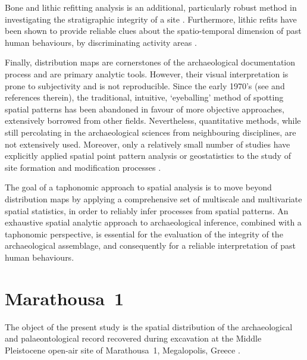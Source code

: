 \documentclass[review,authoryear,times]{elsarticle} %
\begin{document}
Bone and lithic refitting analysis is an additional, particularly robust method in investigating the stratigraphic integrity of a site \citep{Villa1982,Villa1990,Todd1992,Morin2005,Sisk2008}. Furthermore, lithic refits have been shown to provide reliable clues about the spatio-temporal dimension of past human behaviours, by discriminating activity areas \citep{Lopez-Ortega2011,Lopez-Ortega2015,Vaquero2012,Vaquero2015,Clark2016}.

Finally, distribution maps are cornerstones of the archaeological documentation process and are primary analytic tools. However, their visual interpretation is prone to subjectivity and is not reproducible. Since the early 1970's (see \cite{Hodder1976,Orton1982} and references therein), the traditional, intuitive, `eyeballing' method of spotting spatial patterns has been abandoned in favour of more objective approaches, extensively borrowed from other fields. Nevertheless, quantitative methods, while still percolating in the archaeological sciences from neighbouring disciplines, are not extensively used. Moreover, only a relatively small number of studies have explicitly applied spatial point pattern analysis or geostatistics to the study of site formation and modification processes \citep[][but see \cite{Hivernel1984} for an earlier work on the subject]{Lenoble2008,Dominguez-Rodrigo2014b,Dominguez-Rodrigo2014c,Dominguez-Rodrigo2017,Carrer2015,Giusti2016,Organista2017}.

The goal of a taphonomic approach to spatial analysis is to move beyond distribution maps by applying a comprehensive set of multiscale and multivariate spatial statistics, in order to reliably infer processes from spatial patterns. An exhaustive spatial analytic approach to archaeological inference, combined with a taphonomic perspective, is essential for the evaluation of the integrity of the archaeological assemblage, and consequently for a reliable interpretation of past human behaviours.

\section{Marathousa~1}

The object of the present study is the spatial distribution of the archaeological and palaeontological record recovered during excavation at the Middle Pleistocene open-air site of Marathousa~1, Megalopolis, Greece \citep{Panagopoulou2015,Harvati2016}.
\end{document}
